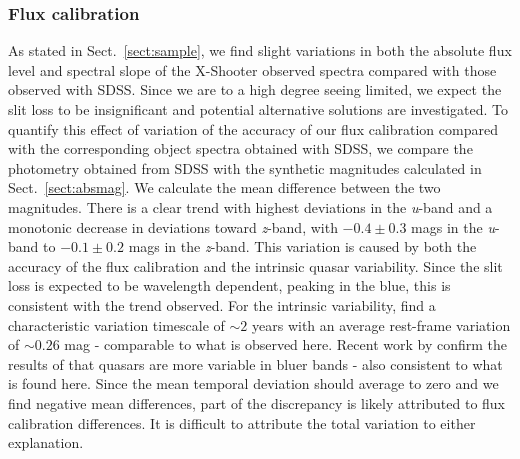 \documentclass{aa}    %
\newcommand{\sectionname}{Sect.}
\newcommand{\Sect}[1]{\sectionname~\ref{sect:#1}}
\newcommand{\sect}[1]{\Sect{#1}}
\newcommand{\sectlabel}[1]{\label{sect:#1}}
\begin{document}
\subsubsection{Flux calibration}  \sectlabel{Flux calibration}
As stated in \sect{sample}, we find slight variations in both the
absolute flux level and spectral slope of the X-Shooter observed
spectra compared with those observed with SDSS. Since we are to a
high degree seeing limited, we expect the slit loss to be
insignificant and potential alternative solutions are investigated. To
quantify this effect of variation of the accuracy of our
flux calibration compared with the corresponding object spectra
obtained with SDSS, we compare the photometry obtained from SDSS with
the synthetic magnitudes calculated in \sect{absmag}. We calculate the
mean difference between the two magnitudes. There is a clear trend with highest
deviations in the
\textit{u}-band and a monotonic decrease in deviations toward
\textit{z}-band, with $-0.4 \pm 0.3$ mags in the \textit{u}-band to $-0.1
\pm 0.2$ mags in the \textit{z}-band. This variation is
caused by both the accuracy of the flux calibration and the intrinsic
quasar variability. Since the slit loss is expected to be wavelength
dependent, peaking in the blue, this is consistent with the trend
observed. For the intrinsic variability, \cite{MacLeod2012} find a
characteristic variation timescale of $\sim 2$ years with an average
rest-frame variation of $\sim 0.26$ mag - comparable to what is observed here.
Recent work
by \cite{Morganson2014} confirm the results of \cite{Helfand2001} that
quasars are more variable in bluer bands - also consistent to what is
found here. Since the mean temporal deviation should average to zero and we find
negative mean differences, part of the discrepancy is likely attributed to flux
calibration differences. It is difficult to attribute the total variation to
either explanation.


\end{document}
